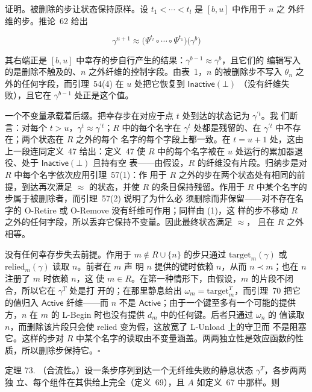 证明。被删除的步让状态保持原样。设 \(t_{1} < \cdots < t_{l}\) 是 \([b, u]\) 中作用于 \(n\) 之
外纤维的步。推论~62 给出

\[
\gamma^{u+1} \approx \bigl( \Psi^{t_{l}} \circ \cdots \circ \Psi^{t_{1}} \bigr) \bigl( \gamma^{b} \bigr)
\]

其右端正是 \([b, u]\) 中幸存的步自行产生的结果：\(\gamma^{b-1} \approx \gamma^{b}\)，且它们的
编辑写入的是删除不触及的、\(n\) 之外纤维的控制字段。由表~1，\(n\) 的被删除步不写入
\(\theta_{n}\) 之外的任何字段，而引理~54(4) 在 \(u\) 处把它恢复到 \(\mathsf{Inactive}(\bot)\)
（没有纤维失败），且它在 \(\gamma^{b-1}\) 处正是这个值。

一个不变量承载着后缀。把幸存步在对应于点 \(t\) 处到达的状态记为 \(\gamma^{\prime t}\)。我
们断言：对每个 \(t > u\)，\(\gamma^{t} \approx \gamma^{\prime t}\)；\(R\) 中的每个名字在
\(\gamma^{t}\) 处都是残留的、在 \(\gamma^{\prime t}\) 中不存在；两个状态在 \(R\) 之外的每个
名字的每个字段上都一致。在 \(t = u+1\) 处，这由上一段连同定义~47 给出：定义~47 使
\(R\) 中的每个名字被在 \(u\) 处运行的累加器退役、处于 \(\mathsf{Inactive}(\bot)\) 且持有空
表——由假设，\(R\) 的纤维没有片段。归纳步是对 \(R\) 中每个名字依次应用引理~57(1)：作
用于 \(R\) 之外的步在两个状态处有相同的前提，到达再次满足 \(\approx\) 的状态，并使 \(R\)
的条目保持残留。作用于 \(R\) 中某个名字的步属于被删除者，而引理~57(2) 说明了为什么必
须删除而非保留——对不存在名字的 O-Retire 或 O-Remove 没有纤维可作用；同样由 (1)，这
样的步不移动 \(R\) 之外的任何字段，所以丢弃它保持不变量。因此最终状态满足 \(\approx\)，
且在 \(R\) 之外相等。

没有任何幸存步失去前提。作用于 \(m \notin R \cup \{n\}\) 的步只通过
\(\mathrm{target}_{m}(\gamma)\) 或 \(\mathrm{relied}_{m}(\gamma)\) 读取 \(n\)。前者在 \(m\) 声
明 \(n\) 提供的键时依赖 \(n\)，从而 \(n \prec m\)；也在 \(n\) 注册了 \(m\) 时依赖 \(n\)，这
使 \(m \in R\)。在第一种情形下，由假设，\(m\) 的片段不闭合，所以它在 \(\gamma^{T}\) 处是打
开的；在那里静息给出 \(\omega_{m} = \mathrm{target}_{m}^{T}\)，而引理~70 把它的值归入
\(\mathsf{Active}\) 纤维——而 \(n\) 不是 \(\mathsf{Active}\)；由于一个键至多有一个可能的提供
方，\(n\) 在 \(m\) 的 L-Begin 时也没有提供 \(d_{m}\) 中的任何键。后者只通过 \(\omega_{n}\) 的
值读取 \(n\)，而删除该片段只会使 \(\mathrm{relied}\) 变为假，这放宽了 L-Unload 上的守卫而
不是阻塞它。这样的步对 \(R\) 中某个名字的读取由不变量涵盖。两两独立性是效应函数的性
质，所以删除步保持它。\(\square\)

定理 73. （合流性。）设一条步序列到达一个无纤维失败的静息状态 \(\gamma^{T}\)，各步两两独
立、每个组件在其供给上完全（定义~69），且 \(A\) 如定义~67 中那样。则

